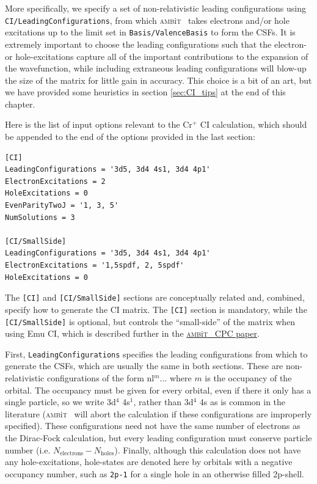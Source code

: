 \documentclass{report}
\newcommand{\ambit}{\textsc{amb}{\footnotesize i}\textsc{t}}
\begin{document}
More
specifically, we specify a set of non-relativistic leading configurations using 
\texttt{CI/LeadingConfigurations}, from which \ambit~ takes electrons and/or hole excitations up to the
limit set in \texttt{Basis/ValenceBasis} to form the CSFs. It is extremely important to choose the
leading configurations such that the electron- or hole-excitations capture all of the important
contributions to the expansion of the wavefunction, while including extraneous leading configurations
will blow-up the size of the matrix for little gain in accuracy. This choice is a bit of an art, but we
have provided some heuristics in section \ref{sec:CI_tips} at the end of this chapter.

Here is the list of input options relevant to the Cr$^+$ CI calculation, which should be appended to the
end of the options provided in the last section:

\begin{verbatim}
[CI]                                                                           
LeadingConfigurations = '3d5, 3d4 4s1, 3d4 4p1'                                
ElectronExcitations = 2                                                        
HoleExcitations = 0                                                            
EvenParityTwoJ = '1, 3, 5'                                                     
NumSolutions = 3
                                                                               
[CI/SmallSide]                                                                 
LeadingConfigurations = '3d5, 3d4 4s1, 3d4 4p1'                                
ElectronExcitations = '1,5spdf, 2, 5spdf'                                      
HoleExcitations = 0 
\end{verbatim}

The \texttt{[CI]} and \texttt{[CI/SmallSide]} sections are conceptually related and, combined, specify 
how to generate the CI matrix. The \texttt{[CI]} section is mandatory, while the \texttt{[CI/SmallSide]}
is optional, but controls the ``small-side'' of the matrix when using Emu CI, which is described further
in the \href{link_goes_here}{\ambit~ CPC paper}.

First, \texttt{LeadingConfigurations} specifies the leading configurations from which to generate the 
CSFs, which are usually the
same in both sections. These are non-relativistic configurations of the form nl$^{m}...$ where $m$ is 
the occupancy of the orbital. The occupancy must be given for every orbital, even if there it only has a
single particle, so we write 3d$^4$ 4s$^1$, rather than 3d$^4$ 4s as is common in the literature (\ambit
~will abort the calculation if these configurations are improperly specified). These configurations need
not have the same number of electrons as the Dirac-Fock calculation, but every leading configuration
must conserve particle number (i.e. $N_{\mathrm{electrons}} - N_{\mathrm{holes}}$). Finally, although
this calculation does not have any hole-excitations, hole-states are denoted here by orbitals with a
negative occupancy number, such as \texttt{2p-1} for a single hole in an otherwise filled 2p-shell.
\end{document}
